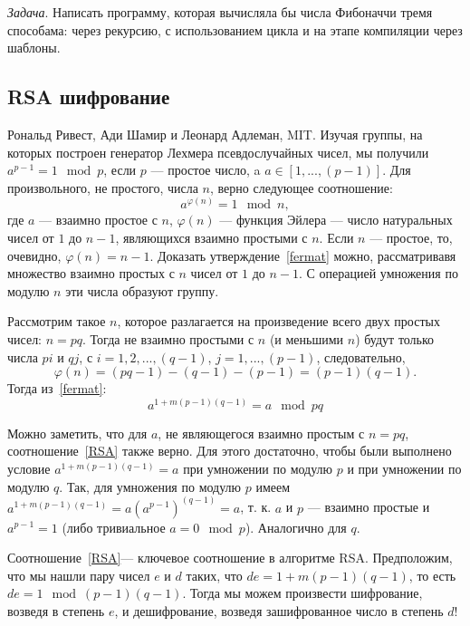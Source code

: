 \documentclass{book}
\begin{document}
{\it Задача}. Написать программу, которая вычисляла бы числа Фибоначчи тремя способама: через
рекурсию, с использованием цикла и на этапе компиляции через шаблоны.

\subsection{RSA шифрование}

Рональд Ривест, Ади Шамир и Леонард Адлеман, MIT. Изучая группы, на которых построен генератор
Лехмера псевдослучайных чисел, мы получили $a^{p - 1} = 1 \mod p$, если $p$ --- простое число, a $a
\in [1, ..., (p-1)]$. Для произвольного, не простого, числа $n$, верно следующее соотношение:
\begin{equation}
    \label{fermat}
    a^{\varphi(n)} = 1 \mod n,
\end{equation}
где $a$ --- взаимно простое с $n$, $\varphi(n)$ --- функция Эйлера --- число натуральных чисел от $1$ до $n - 1$, являющихся
взаимно простыми с $n$. Если $n$ --- простое, то, очевидно, $\varphi(n) = n - 1$. Доказать
утверждение~\ref{fermat} можно, рассматривавя множество взаимно простых с $n$ чисел от $1$ до $n -
1$. С операцией умножения по модулю $n$ эти числа образуют группу.

Рассмотрим такое $n$, которое разлагается на произведение всего двух простых чисел: $n = pq$. Тогда
не взаимно простыми с $n$ (и меньшими $n$) будут только числа $pi$ и $q j$, с $i = 1, 2, ..., (q -
1)$, $j = 1,..., (p  - 1)$, следовательно,
\begin{equation}
    \varphi(n) = (p q - 1) - (q - 1) - (p - 1) = (p - 1)(q - 1).
\end{equation}
Тогда из~\ref{fermat}:
\begin{equation}
    \label{RSA}
    a^{1 + m (p - 1) (q - 1)} = a \mod pq
\end{equation}

Можно заметить, что для $a$, не являющегося взаимно простым с $n = pq$, соотношение~\ref{RSA} также
верно. Для этого достаточно, чтобы были выполнено условие $a^{1 + m (p - 1) (q - 1)} = a$ при
умножении по модулю $p$ и при умножении по модулю $q$. Так, для умножения по модулю $p$ имеем $a^{1
+ m (p - 1) (q - 1)} = a (a^{p - 1})^{(q - 1)} = a$, т. к. $a$ и $p$ --- взаимно простые и $a^{p -
1} = 1$ (либо тривиальное $a = 0 \mod p$). Аналогично для $q$. 

Соотношение~\ref{RSA}--- ключевое соотношение в алгоритме RSA.
Предположим, что мы нашли пару чисел $e$ и $d$ таких, что
$de = 1 + m (p - 1) (q - 1)$, то есть $de = 1 \mod (p - 1) (q - 1)$. Тогда мы можем произвести
шифрование, возведя в степень $e$, и дешифрование, возведя зашифрованное число в степень $d$!
\end{document}
